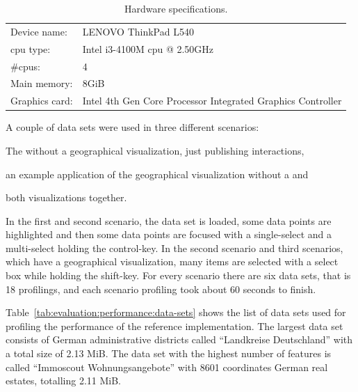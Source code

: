 \begin{table}[ht]
  \centering
  \caption{Hardware specifications.}%
  \label{tab:evaluation:performance:hardware}
  \begin{tabularx}{\linewidth}{ll}
    Device name: & LENOVO ThinkPad L540 \\
    \gls{cpu} type: & Intel i3-4100M \gls{cpu} @ 2.50GHz \\
    \#\gls{cpu}s: & 4 \\
    Main memory: & 8GiB \\
    Graphics card: & Intel 4th Gen Core Processor Integrated Graphics Controller \\
  \end{tabularx}
\end{table}

A couple of data sets were used in three different scenarios:
\begin{enumerate*}[label=(\arabic*)]
  \item The \tmap{} without a geographical visualization, just publishing interactions,
  \item an example application of the geographical visualization without a \tmap{} and
  \item both visualizations together.
\end{enumerate*}

In the first and second scenario, the data set is loaded, some data points are highlighted and then some data points are focused with a single-select and a multi-select holding the control-key.
In the second scenario and third scenarios, which have a geographical visualization, many items are selected with a select box while holding the shift-key.
For every scenario there are six data sets, that is 18 profilings, and each scenario profiling took about 60 seconds to finish.

Table~\ref{tab:evaluation:performance:data-sets} shows the list of data sets used for profiling the performance of the reference implementation.
The largest data set consists of German administrative districts called ``Landkreise Deutschland'' with a total size of 2.13 MiB.
The data set with the highest number of features is called ``Immoscout Wohnungsangebote'' with 8601 coordinates German real estates, totalling 2.11 MiB.

